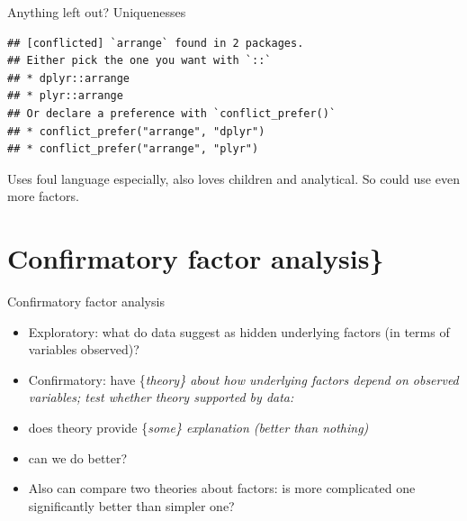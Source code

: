 \documentclass[ignorenonframetext,]{beamer}
\newenvironment{Shaded}{\begin{snugshade}}{\end{snugshade}}
\newcommand{\DataTypeTok}[1]{\textcolor[rgb]{0.13,0.29,0.53}{#1}}
\newcommand{\DecValTok}[1]{\textcolor[rgb]{0.00,0.00,0.81}{#1}}
\newcommand{\FloatTok}[1]{\textcolor[rgb]{0.00,0.00,0.81}{#1}}
\newcommand{\KeywordTok}[1]{\textcolor[rgb]{0.13,0.29,0.53}{\textbf{#1}}}
\newcommand{\NormalTok}[1]{#1}
\newcommand{\OperatorTok}[1]{\textcolor[rgb]{0.81,0.36,0.00}{\textbf{#1}}}
\newcommand{\StringTok}[1]{\textcolor[rgb]{0.31,0.60,0.02}{#1}}
\begin{document}
\begin{frame}[fragile]{Anything left out? Uniquenesses}
\protect\hypertarget{anything-left-out-uniquenesses}{}

\begin{Shaded}
\end{Shaded}

\begin{verbatim}
## [conflicted] `arrange` found in 2 packages.
## Either pick the one you want with `::` 
## * dplyr::arrange
## * plyr::arrange
## Or declare a preference with `conflict_prefer()`
## * conflict_prefer("arrange", "dplyr")
## * conflict_prefer("arrange", "plyr")
\end{verbatim}

Uses foul language especially, also loves children and analytical. So
could use even more factors.

\end{frame}

\hypertarget{confirmatory-factor-analysis}{%
\section{Confirmatory factor
analysis\}}\label{confirmatory-factor-analysis}}

\begin{frame}{Confirmatory factor analysis}
\protect\hypertarget{confirmatory-factor-analysis-1}{}

\begin{itemize}
\item
  Exploratory: what do data suggest as hidden underlying factors (in
  terms of variables observed)?
\item
  Confirmatory: have \{\em theory\} about how underlying factors depend
  on observed variables; test whether theory supported by data:
\item
  does theory provide \{\em some\} explanation (better than nothing)
\item
  can we do better?
\item
  Also can compare two theories about factors: is more complicated one
  significantly better than simpler one?
\end{itemize}

\end{frame}
\end{document}
